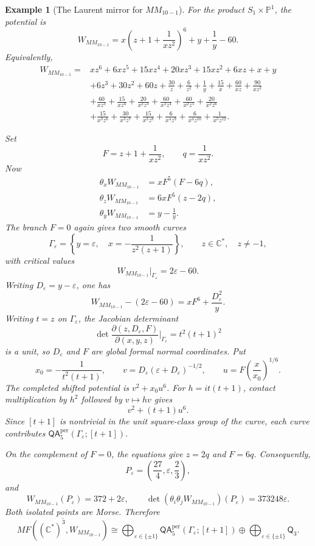 \documentclass[11pt]{amsart}
\newtheorem{example}{Example}[section]
\newcommand{\MorseCat}[1]{\mathsf{Q}_{#1}}
\newcommand{\QAtwist}[3]{\mathsf{QA}^{\mathrm{per}}_{#2}(#1;[#3])}
\begin{document}
\begin{example}[The Laurent mirror for $MM_{10-1}$]
For the product $S_1\times\mathbb P^1$, the potential is
\[
W_{MM_{10-1}}
=x\left(z+1+\frac{1}{xz^2}\right)^6+y+\frac{1}{y}-60.
\]
Equivalently,
\[
\begin{aligned}
W_{MM_{10-1}}={}&xz^6+6xz^5+15xz^4+20xz^3+15xz^2+6xz+x+y\\
&+6z^3+30z^2+60z+\frac{30}{z}+\frac{6}{z^2}+\frac{1}{y}
 +\frac{15}{x}+\frac{60}{xz}+\frac{90}{xz^2}\\
&+\frac{60}{xz^3}+\frac{15}{xz^4}
 +\frac{20}{x^2z^3}+\frac{60}{x^2z^4}
 +\frac{60}{x^2z^5}+\frac{20}{x^2z^6}\\
&+\frac{15}{x^3z^6}+\frac{30}{x^3z^7}+\frac{15}{x^3z^8}
 +\frac{6}{x^4z^9}+\frac{6}{x^4z^{10}}+\frac{1}{x^5z^{12}}.
\end{aligned}
\]

Set
\[
F=z+1+\frac1{xz^2},
\qquad
q=\frac1{xz^2}.
\]
Now
\[
\begin{aligned}
\theta_xW_{MM_{10-1}}&=xF^5(F-6q),\\
\theta_zW_{MM_{10-1}}&=6xF^5(z-2q),\\
\theta_yW_{MM_{10-1}}&=y-\frac1y.
\end{aligned}
\]
The branch $F=0$ again gives two smooth curves
\[
\Gamma_\varepsilon=
\left\{
y=\varepsilon,\quad
x=-\frac1{z^2(z+1)}
\right\},
\qquad
z\in\mathbb C^*,\quad z\neq-1,
\]
with critical values
\[
W_{MM_{10-1}}|_{\Gamma_\varepsilon}=2\varepsilon-60.
\]
Writing $D_\varepsilon=y-\varepsilon$, one has
\[
W_{MM_{10-1}}-(2\varepsilon-60)
=xF^6+\frac{D_\varepsilon^2}{y}.
\]
Writing $t=z$ on $\Gamma_\varepsilon$, the Jacobian determinant
\[
\det\frac{\partial(z,D_\varepsilon,F)}{\partial(x,y,z)}
\bigg|_{\Gamma_\varepsilon}=t^2(t+1)^2
\]
is a unit, so $D_\varepsilon$ and $F$ are global formal normal coordinates.
Put
\[
x_0=-\frac1{t^2(t+1)},\qquad
v=D_\varepsilon(\varepsilon+D_\varepsilon)^{-1/2},\qquad
u=F\left(\frac{x}{x_0}\right)^{1/6}.
\]
The completed shifted potential is $v^2+x_0u^6$. For $h=it(t+1)$,
contact multiplication by $h^2$ followed by $v\mapsto hv$ gives
\[
v^2+(t+1)u^6.
\]
Since $[t+1]$ is nontrivial in the unit square-class group of the curve, each
curve contributes $\QAtwist{\Gamma_\varepsilon}{5}{t+1}$.

On the complement of $F=0$, the equations give $z=2q$ and $F=6q$.
Consequently,
\[
P_\varepsilon=
\left(\frac{27}{4},\varepsilon,\frac23\right),
\]
and
\[
W_{MM_{10-1}}(P_\varepsilon)=372+2\varepsilon,
\qquad
\det(\theta_i\theta_jW_{MM_{10-1}})(P_\varepsilon)
=373248\varepsilon.
\]
Both isolated points are Morse.  Therefore
\[
\overline{MF((\mathbb C^*)^3,W_{MM_{10-1}})}
\cong
\bigoplus_{\varepsilon\in\{\pm1\}}
\QAtwist{\Gamma_\varepsilon}{5}{t+1}
\oplus
\bigoplus_{\varepsilon\in\{\pm1\}}\MorseCat{3}.
\]
\end{example}
\end{document}
